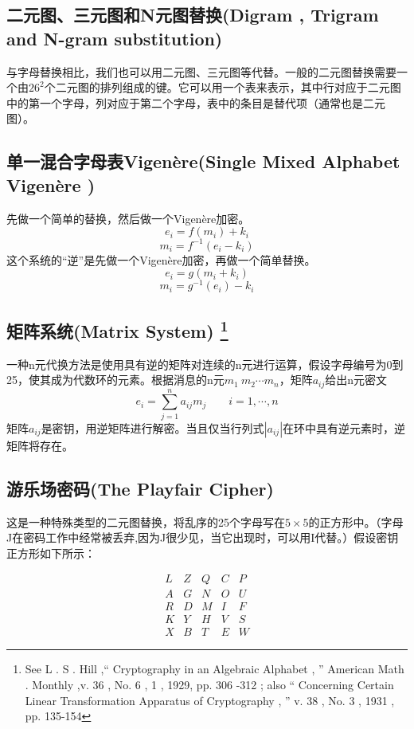 \documentclass[]{article}
\begin{document}
\subsection{二元图、三元图和N元图替换(Digram , Trigram and N-gram substitution)}

与字母替换相比，我们也可以用二元图、三元图等代替。一般的二元图替换需要一个由$26^2$个二元图的排列组成的键。它可以用一个表来表示，其中行对应于二元图中的第一个字母，列对应于第二个字母，表中的条目是替代项（通常也是二元图）。
\par

\subsection{单一混合字母表Vigen\`{e}re(Single Mixed Alphabet Vigen\`{e}re )}
先做一个简单的替换，然后做一个Vigen\`{e}re加密。
\[e_i=f(m_i)+k_i\]
\[m_i=f^{-1}(e_i-k_i)\]
这个系统的“逆”是先做一个Vigen\`{e}re加密，再做一个简单替换。
\[e_i=g(m_i+k_i)\]
\[m_i=g^{-1}(e_i)-k_i\]

\subsection{矩阵系统(Matrix System) \protect\footnote{See L . S . Hill ,“ Cryptography in an Algebraic Alphabet , ” American Math . Monthly ,v. 36 , No. 6 , 1 , 1929, pp. 306 -312 ; also “ Concerning Certain Linear Transformation Apparatus of Cryptography , ” v. 38 , No. 3 , 1931 , pp. 135-154 } }

一种n元代换方法是使用具有逆的矩阵对连续的n元进行运算，假设字母编号为0到25，使其成为代数环的元素。根据消息的n元$m_1\ m_2\cdots m_n$，矩阵$a_{ij}$给出n元密文
\[e_i=\sum_{j=1}^{n}a_{ij}m_j\qquad i=1,\cdots,n\]
矩阵$a_{ij}$是密钥，用逆矩阵进行解密。当且仅当行列式$|a_{ij}|$在环中具有逆元素时，逆矩阵将存在。


\subsection{游乐场密码(The Playfair Cipher)}

这是一种特殊类型的二元图替换，将乱序的25个字母写在$5\times 5$的正方形中。（字母J在密码工作中经常被丢弃,因为J很少见，当它出现时，可以用I代替。）假设密钥正方形如下所示：

\begin{equation}
	\begin{array}{ccccc}
	L &Z &Q &C &P\\
	A &G &N &O &U\\
	R &D &M &I &F\\
	K &Y &H &V &S\\
	X &B &T &E &W \nonumber
	\end{array} 
\end{equation}
\end{document}
